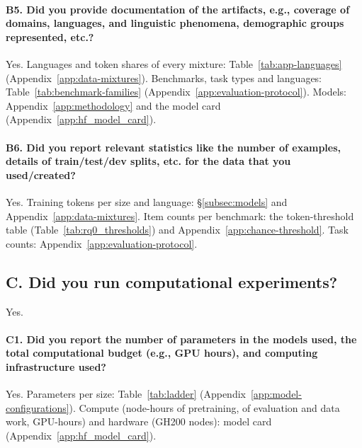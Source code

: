 \paragraph{B5. Did you provide documentation of the artifacts, e.g., coverage of domains, languages, and linguistic phenomena, demographic groups represented, etc.?}
Yes. Languages and token shares of every mixture: Table~\ref{tab:app-languages} (Appendix~\ref{app:data-mixtures}). Benchmarks, task types and languages: Table~\ref{tab:benchmark-families} (Appendix~\ref{app:evaluation-protocol}). Models: Appendix~\ref{app:methodology} and the model card (Appendix~\ref{app:hf_model_card}).

\paragraph{B6. Did you report relevant statistics like the number of examples, details of train/test/dev splits, etc. for the data that you used/created?}
Yes. Training tokens per size and language: \S\ref{subsec:models} and Appendix~\ref{app:data-mixtures}. Item counts per benchmark: the token-threshold table (Table~\ref{tab:rq0_thresholds}) and Appendix~\ref{app:chance-threshold}. Task counts: Appendix~\ref{app:evaluation-protocol}.

\subsection*{C. Did you run computational experiments?}
Yes.

\paragraph{C1. Did you report the number of parameters in the models used, the total computational budget (e.g., GPU hours), and computing infrastructure used?}
Yes. Parameters per size: Table~\ref{tab:ladder} (Appendix~\ref{app:model-configurations}). Compute (\npretrainnodehours node-hours of pretraining, \nothernodehours of evaluation and data work, \ngpuhours GPU-hours) and hardware (GH200 nodes): model card (Appendix~\ref{app:hf_model_card}).

